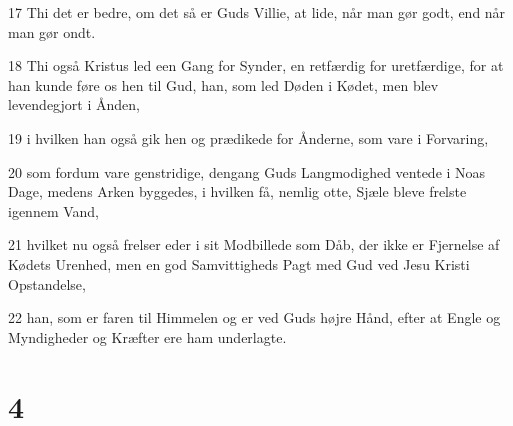 \par 17 Thi det er bedre, om det så er Guds Villie, at lide, når man gør godt, end når man gør ondt.
\par 18 Thi også Kristus led een Gang for Synder, en retfærdig for uretfærdige, for at han kunde føre os hen til Gud, han, som led Døden i Kødet, men blev levendegjort i Ånden,
\par 19 i hvilken han også gik hen og prædikede for Ånderne, som vare i Forvaring,
\par 20 som fordum vare genstridige, dengang Guds Langmodighed ventede i Noas Dage, medens Arken byggedes, i hvilken få, nemlig otte, Sjæle bleve frelste igennem Vand,
\par 21 hvilket nu også frelser eder i sit Modbillede som Dåb, der ikke er Fjernelse af Kødets Urenhed, men en god Samvittigheds Pagt med Gud ved Jesu Kristi Opstandelse,
\par 22 han, som er faren til Himmelen og er ved Guds højre Hånd, efter at Engle og Myndigheder og Kræfter ere ham underlagte.

\chapter{4}

